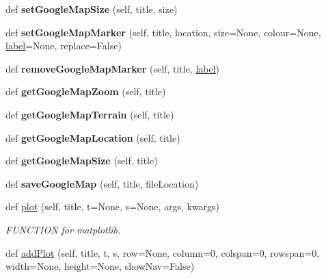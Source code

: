 \begin{DoxyCompactItemize}
def {\bfseries set\+Google\+Map\+Size} (self, title, size)
\item 
\mbox{\label{classappjar_1_1gui_a3e2a4d161660ea7a1ab4b47e450fed25}} 
def {\bfseries set\+Google\+Map\+Marker} (self, title, location, size=None, colour=None, \hyperlink{classappjar_1_1gui_a161659a9096715ced2da924ab88ddecc}{label}=None, replace=False)
\item 
\mbox{\label{classappjar_1_1gui_aa5b3895712c7e3bebdae440e1cd74803}} 
def {\bfseries remove\+Google\+Map\+Marker} (self, title, \hyperlink{classappjar_1_1gui_a161659a9096715ced2da924ab88ddecc}{label})
\item 
\mbox{\label{classappjar_1_1gui_a1413b8cb112bd3875a953d1f4aaf9be0}} 
def {\bfseries get\+Google\+Map\+Zoom} (self, title)
\item 
\mbox{\label{classappjar_1_1gui_a41517291a0ffbe2a3e732a7ea32b750b}} 
def {\bfseries get\+Google\+Map\+Terrain} (self, title)
\item 
\mbox{\label{classappjar_1_1gui_a8884ac1c36fbe2cb5b2f6940d2d588b2}} 
def {\bfseries get\+Google\+Map\+Location} (self, title)
\item 
\mbox{\label{classappjar_1_1gui_abb7b64cf432fde85f6bfdec16228cab9}} 
def {\bfseries get\+Google\+Map\+Size} (self, title)
\item 
\mbox{\label{classappjar_1_1gui_aa01f565c0c37a61b6721e96e8555ed00}} 
def {\bfseries save\+Google\+Map} (self, title, file\+Location)
\item 
def \hyperlink{classappjar_1_1gui_a59d1942dcaf3c876081d709c7249faf5}{plot} (self, title, t=None, s=None, args, kwargs)
\begin{DoxyCompactList}\small\item\em F\+U\+N\+C\+T\+I\+ON for matplotlib. \end{DoxyCompactList}\item 
def \hyperlink{classappjar_1_1gui_ad765e15c5069624ba6d84871710880c8}{add\+Plot} (self, title, t, s, row=None, column=0, colspan=0, rowspan=0, width=None, height=None, show\+Nav=False)
\item 
\mbox{\label{classappjar_1_1gui_a450b32bf7c252e9ad82568b515541d49}} 

\end{DoxyCompactItemize}
